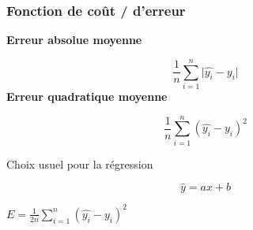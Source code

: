 \begin{frame}
  \frametitle{Fonction de coût / d'erreur}
  \begin{minipage}[l]{0.5\textwidth}
    \textbf{Erreur absolue moyenne}

    \[
      \frac{1}{n}\sum_{i=1}^n\lvert\hat{y_i} - y_i\rvert
    \]
    \textbf{Erreur quadratique moyenne}

    \[
      \frac{1}{n}\sum_{i=1}^n( \hat{y_i} - y_i )^2
    \]
  \end{minipage}\hfill
  \begin{minipage}[l]{0.5\textwidth}
  \end{minipage}\hfill
\end{frame}

\begin{frame}{Choix usuel pour la régression}
  \begin{minipage}[l]{0.49\linewidth}
    \[
      \hat{y} = ax+b
    \]
  \end{minipage}\hfill
  \begin{minipage}[l]{0.49\linewidth}
    $\boxed{E = \frac{1}{2n}\sum_{i=1}^n( \hat{y_i} - y_i )^2}$ \\
  \end{minipage}\hfill
\end{frame}
